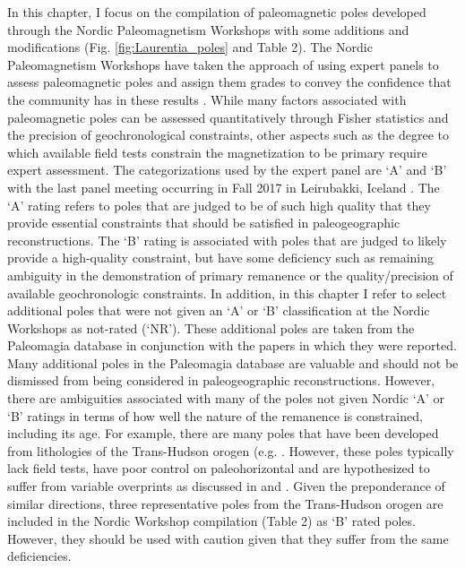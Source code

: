 \documentclass[twocolumn, switch]{article} %
\begin{document}
In this chapter, I focus on the compilation of paleomagnetic poles developed through the Nordic Paleomagnetism Workshops with some additions and modifications (Fig. \ref{fig:Laurentia_poles} and Table 2). The Nordic Paleomagnetism Workshops have taken the approach of using expert panels to assess paleomagnetic poles and assign them grades to convey the confidence that the community has in these results \citep{Evans2021a}. While many factors associated with paleomagnetic poles can be assessed quantitatively through Fisher statistics and the precision of geochronological constraints, other aspects such as the degree to which available field tests constrain the magnetization to be primary require expert assessment. The categorizations used by the expert panel are `A' and `B' with the last panel meeting occurring in Fall 2017 in Leirubakki, Iceland \citep{Brown2018a}. The `A' rating refers to poles that are judged to be of such high quality that they provide essential constraints that should be satisfied in paleogeographic reconstructions. The `B' rating is associated with poles that are judged to likely provide a high-quality constraint, but have some deficiency such as remaining ambiguity in the demonstration of primary remanence or the quality/precision of available geochronologic constraints. In addition, in this chapter I refer to select additional poles that were not given an `A' or `B' classification at the Nordic Workshops as not-rated (`NR'). These additional poles are taken from the Paleomagia database \citep{Veikkolainen2014a} in conjunction with the papers in which they were reported. Many additional poles in the Paleomagia database are valuable and should not be dismissed from being considered in paleogeographic reconstructions. However, there are ambiguities associated with many of the poles not given Nordic `A' or `B' ratings in terms of how well the nature of the remanence is constrained, including its age. For example, there are many poles that have been developed from lithologies of the Trans-Hudson orogen (e.g. \citealp{Symons2005a}. However, these poles typically lack field tests, have poor control on paleohorizontal and are hypothesized to suffer from variable overprints as discussed in \cite{Raub2008a} and \cite{DAgrella-Filho2020a}. Given the preponderance of similar directions, three representative poles from the Trans-Hudson orogen are included in the Nordic Workshop compilation (Table 2) as `B' rated poles. However, they should be used with caution given that they suffer from the same deficiencies. 
\end{document}
